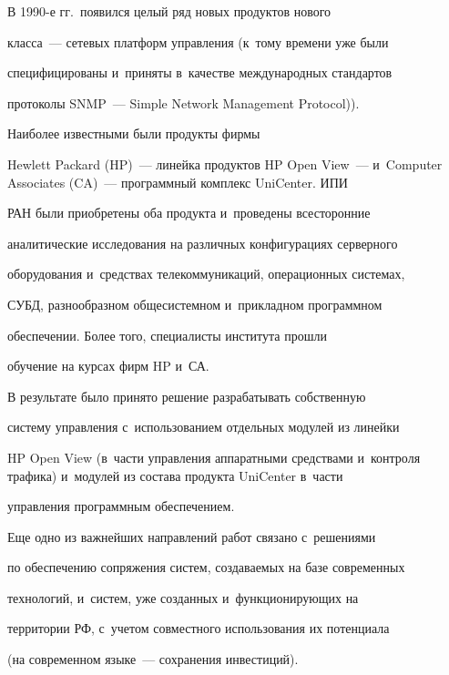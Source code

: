      В 1990-е гг.\ появился целый ряд новых продуктов нового


класса~--- сетевых платформ управления (к~тому времени уже были


специфицированы и~приняты в~качестве международных стандартов


протоколы SNMP~--- Simple Network Management Protocol)).


Наиболее известными были продукты фирмы


Hewlett Packard (HP)~--- линейка продуктов HP Open View~--- и~Computer Associates (CA)~--- программный комплекс UniCenter. ИПИ


РАН были приобретены оба продукта и~проведены всесторонние


аналитические исследования на различных конфигурациях серверного


оборудования и~средствах телекоммуникаций, операционных системах,


СУБД, разнообразном общесистемном и~прикладном программном


обеспечении. Более того, специалисты института прошли


обучение на курсах фирм HP и~СА.





     В результате было принято решение разрабатывать собственную


систему управления с~использованием отдельных модулей из линейки


HP Open View (в~час\-ти управления аппаратными средствами и~контроля трафика) и~модулей из состава продукта UniCenter в~части


управления программным обес\-пе\-че\-нием.


{





}





     Еще одно из важнейших направлений работ связано с~решениями


по обеспечению сопряжения систем, создаваемых на базе современных


технологий, и~систем, уже созданных и~функционирующих на


территории РФ, с~учетом совместного использования их потенциала


(на современном языке~--- сохранения ин\-вес\-тиций).


{





}





